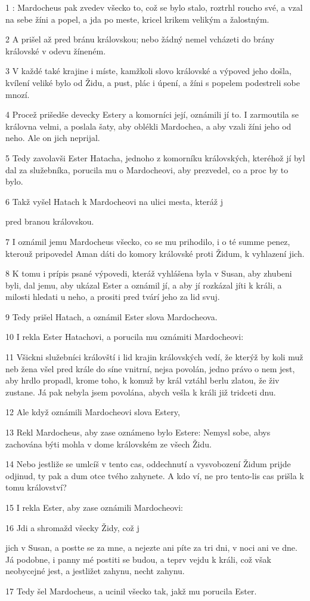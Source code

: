 \par 1 : Mardocheus pak zvedev všecko to, což se bylo stalo, roztrhl roucho své, a vzal na sebe žíni a popel, a jda po meste, kricel krikem velikým a žalostným.
\par 2 A prišel až pred bránu královskou; nebo žádný nemel vcházeti do brány královské v odevu žíneném.
\par 3 V každé také krajine i míste, kamžkoli slovo královské a výpoved jeho došla, kvílení veliké bylo od Židu, a pust, plác i úpení, a žíni s popelem podestreli sobe mnozí.
\par 4 Procež prišedše devecky Estery a komorníci její, oznámili jí to. I zarmoutila se královna velmi, a poslala šaty, aby oblékli Mardochea, a aby vzali žíni jeho od neho. Ale on jich neprijal.
\par 5 Tedy zavolavši Ester Hatacha, jednoho z komorníku královských, kteréhož jí byl dal za služebníka, porucila mu o Mardocheovi, aby prezvedel, co a proc by to bylo.
\par 6 Takž vyšel Hatach k Mardocheovi na ulici mesta, kteráž j\par pred branou královskou.
\par 7 I oznámil jemu Mardocheus všecko, co se mu prihodilo, i o té summe penez, kterouž pripovedel Aman dáti do komory královské proti Židum, k vyhlazení jich.
\par 8 K tomu i prípis psané výpovedi, kteráž vyhlášena byla v Susan, aby zhubeni byli, dal jemu, aby ukázal Ester a oznámil jí, a aby jí rozkázal jíti k králi, a milosti hledati u neho, a prositi pred tvárí jeho za lid svuj.
\par 9 Tedy prišel Hatach, a oznámil Ester slova Mardocheova.
\par 10 I rekla Ester Hatachovi, a porucila mu oznámiti Mardocheovi:
\par 11 Všickni služebníci královští i lid krajin královských vedí, že kterýž by koli muž neb žena všel pred krále do síne vnitrní, nejsa povolán, jedno právo o nem jest, aby hrdlo propadl, krome toho, k komuž by král vztáhl berlu zlatou, že živ zustane. Já pak nebyla jsem povolána, abych vešla k králi již tridceti dnu.
\par 12 Ale když oznámili Mardocheovi slova Estery,
\par 13 Rekl Mardocheus, aby zase oznámeno bylo Estere: Nemysl sobe, abys zachována býti mohla v dome královském ze všech Židu.
\par 14 Nebo jestliže se umlcíš v tento cas, oddechnutí a vysvobození Židum prijde odjinud, ty pak a dum otce tvého zahynete. A kdo ví, ne pro tento-lis cas prišla k tomu království?
\par 15 I rekla Ester, aby zase oznámili Mardocheovi:
\par 16 Jdi a shromažd všecky Židy, což j\par jich v Susan, a postte se za mne, a nejezte ani píte za tri dni, v noci ani ve dne. Já podobne, i panny mé postiti se budou, a teprv vejdu k králi, což však neobycejné jest, a jestližet zahynu, necht zahynu.
\par 17 Tedy šel Mardocheus, a ucinil všecko tak, jakž mu porucila Ester.


